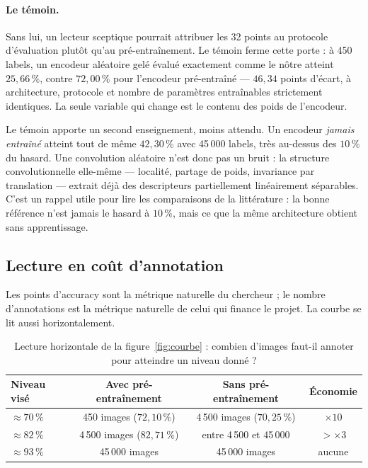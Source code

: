 \documentclass[11pt,a4paper]{article}
\begin{document}
\paragraph{Le témoin.} Sans lui, un lecteur sceptique pourrait attribuer les 32 points au
protocole d'évaluation plutôt qu'au pré-entraînement. Le témoin ferme cette porte : à 450
labels, un encodeur aléatoire gelé évalué exactement comme le nôtre atteint $25{,}66\,\%$,
contre $72{,}00\,\%$ pour l'encodeur pré-entraîné --- $46{,}34$ points d'écart, à
architecture, protocole et nombre de paramètres entraînables strictement identiques. La seule
variable qui change est le contenu des poids de l'encodeur.

Le témoin apporte un second enseignement, moins attendu. Un encodeur \emph{jamais entraîné}
atteint tout de même $42{,}30\,\%$ avec 45\,000 labels, très au-dessus des $10\,\%$ du
hasard. Une convolution aléatoire n'est donc pas un bruit : la structure convolutionnelle
elle-même --- localité, partage de poids, invariance par translation --- extrait déjà des
descripteurs partiellement linéairement séparables. C'est un rappel utile pour lire les
comparaisons de la littérature : la bonne référence n'est jamais le hasard à $10\,\%$, mais
ce que la même architecture obtient sans apprentissage.

\subsection{Lecture en coût d'annotation}
\label{sec:cout-annotation}

Les points d'accuracy sont la métrique naturelle du chercheur ; le nombre d'annotations est
la métrique naturelle de celui qui finance le projet. La courbe se lit aussi horizontalement.

\begin{table}[htbp]
\centering\small
\caption{Lecture horizontale de la figure~\ref{fig:courbe} : combien d'images faut-il
annoter pour atteindre un niveau donné ?}
\label{tab:cout}
\begin{tabular}{@{}lccc@{}}
\toprule
\textbf{Niveau visé} & \textbf{Avec pré-entraînement} & \textbf{Sans pré-entraînement}
& \textbf{Économie} \\
\midrule
$\approx 70\,\%$ & 450 images ($72{,}10\,\%$)   & 4\,500 images ($70{,}25\,\%$)  & $\times 10$ \\
$\approx 82\,\%$ & 4\,500 images ($82{,}71\,\%$) & entre 4\,500 et 45\,000       & $> \times 3$ \\
$\approx 93\,\%$ & 45\,000 images               & 45\,000 images                 & aucune \\
\bottomrule
\end{tabular}
\end{table}
\end{document}
